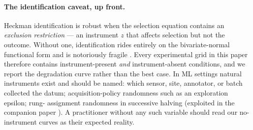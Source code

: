 \documentclass[10pt]{article}
\begin{document}
\paragraph{The identification caveat, up front.} Heckman identification
is robust when the selection equation contains an \emph{exclusion
restriction} --- an instrument $z$ that affects selection but not the
outcome. Without one, identification rides entirely on the bivariate-normal
functional form and is notoriously fragile
\citep{puhani2000,vella1998,winship1992}. Every experimental grid in this
paper therefore contains instrument-present \emph{and} instrument-absent
conditions, and we report the degradation curve rather than the best
case. In ML settings natural instruments exist and should be named:
which sensor, site, annotator, or batch collected the datum;
acquisition-policy randomness such as an exploration epsilon; rung-
assignment randomness in successive halving (exploited in the companion
paper \citep{howe2026survivor}). A practitioner without any such variable
should read our no-instrument curves as their expected reality.
\end{document}

